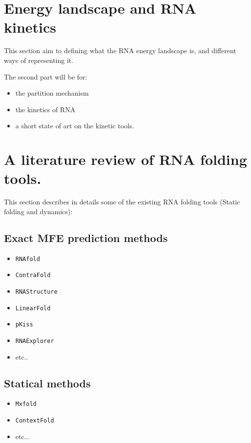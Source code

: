 \section{Energy landscape and RNA kinetics} %

This section aim to defining what the RNA energy landscape is, and different ways of representing it. 

The second part will be for: 
\begin{itemize}
	\item the partition mechanism 
	\item the kinetics of RNA 
	\item a short state of art on the kinetic tools. 
\end{itemize}

\section{A literature review of RNA folding tools.}
This section describes in details some of the existing RNA folding tools (Static folding and dynamics): 

\subsection{Exact MFE prediction methods}
\begin{itemize}
	\item \texttt{RNAfold} 
	\item \texttt{ContraFold}
	\item \texttt{RNAStructure}
	\item \texttt{LinearFold}
	\item \texttt{pKiss}
	\item \texttt{RNAExplorer}
	\item etc..
\end{itemize}

\subsection{Statical methods}
\begin{itemize}
	\item \texttt{Mxfold} 
	\item \texttt{ContextFold}
	\item etc...
\end{itemize}

